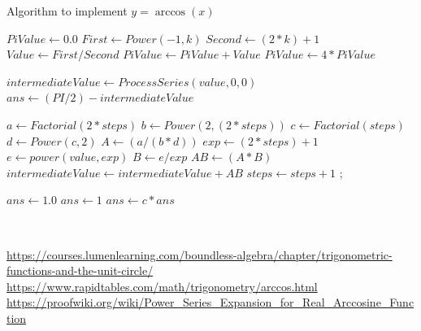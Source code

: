 \documentclass[a4paper,10pt]{report}
\begin{document}
\begin{algorithm}
\caption{Algorithm to implement $y=\arccos(x)$}
\label{alg:myalgo}
\begin{algorithmic}[1]

 \label{alg:a-line}
    \State $PiValue \gets 0.0$
    	\State $First \gets Power(-1,k)$
	    \State $Second \gets (2*k)+1$
	    \State $Value \gets  First/Second$ 
	    \State $PiValue \gets  PiValue + Value$ 
	\EndFor	
	    \State $PiValue \gets  4*PiValue$ 
        \State {}
\EndFunction

\Statex
{} \label{alg:a-line}
		\State {}
	\EndIf
	    \State {}
	\EndIf
    \State $intermediateValue \gets ProcessSeries(value,0,0)$
    \State $ans \gets (PI / 2) - intermediateValue$
	\State {}
\EndFunction

\Statex
{} \label{alg:a-line}
        \State $a \gets Factorial(2 * steps)$
    		\State {}
	    \EndIf
		\State $b \gets Power(2, (2 * steps))$
		\State $c \gets Factorial(steps)$ 
		\State $d \gets Power(c, 2)$
		\State $A \gets (a / (b * d))$
		\State $exp \gets (2 * steps) + 1$
		\State $e  \gets power(value, exp)$
		\State $B  \gets e / exp$
		\State $AB \gets  (A * B)$
		\State $intermediateValue \gets intermediateValue + AB$
		\State $steps \gets steps+1$
		\State {};
\EndFunction

\Statex
{} \label{alg:a-line}
        \State {}
    \EndIf
    \State {}
\EndFunction

\Statex
	 \label{alg:a-line}
		\State $ans \gets 1.0$
			\State $ans \gets 1$
			\State {}
		\EndIf
			\State $ans \gets c*ans$
		\EndFor
		\State {}
	\EndFunction

\end{algorithmic}
\end{algorithm}
\\
  

\begin{thebibliography}{9}
\url{https://courses.lumenlearning.com/boundless-algebra/chapter/trigonometric-functions-and-the-unit-circle/}
\url{https://www.rapidtables.com/math/trigonometry/arccos.html}
\url{https://proofwiki.org/wiki/Power_Series_Expansion_for_Real_Arccosine_Function}
\end{thebibliography}
\end{document}
